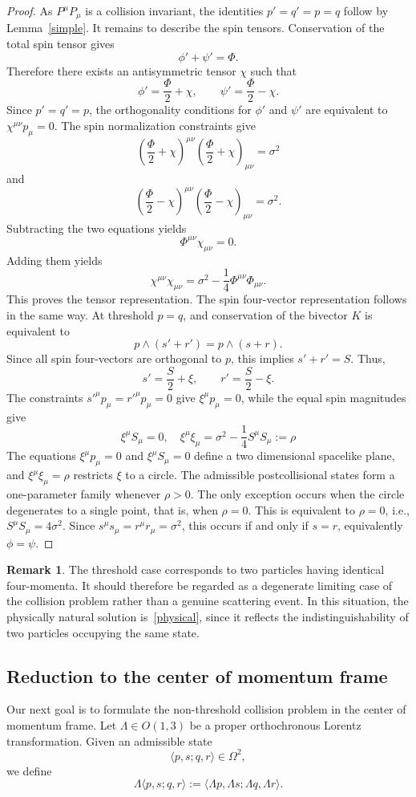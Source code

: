 \documentclass[12pt]{article}
\theoremstyle{plain}
\theoremstyle{definition}
\newtheorem{remark}[theorem]{Remark}
\begin{document}
\begin{proof}
As $P^\mu P_\mu$ is a collision invariant, the identities $p'=q'=p=q$ follow by Lemma~\ref{simple}. 
It remains to describe the spin tensors. Conservation of the total spin tensor gives
\[
\phi'+\psi'=\Phi.
\]
Therefore there exists an antisymmetric tensor $\chi$ such that
\[
\phi'=\frac{\Phi}{2}+\chi,
\qquad
\psi'=\frac{\Phi}{2}-\chi.
\]
Since $p'=q'=p$, the orthogonality conditions for $\phi'$ and $\psi'$ are equivalent to $\chi^{\mu\nu}p_\mu=0$. 
The spin normalization constraints give
\[
\left(\frac{\Phi}{2}+\chi\right)^{\mu\nu}
\left(\frac{\Phi}{2}+\chi\right)_{\mu\nu}
=
\sigma^2
\]
and
\[
\left(\frac{\Phi}{2}-\chi\right)^{\mu\nu}
\left(\frac{\Phi}{2}-\chi\right)_{\mu\nu}
=
\sigma^2.
\]
Subtracting the two equations yields
\[
\Phi^{\mu\nu}\chi_{\mu\nu}=0.
\]
Adding them yields
\[
\chi^{\mu\nu}\chi_{\mu\nu}
=
\sigma^2-\frac14\Phi^{\mu\nu}\Phi_{\mu\nu}.
\]
This proves the tensor representation.
The spin four-vector representation follows in the same way. At threshold $p=q$, and conservation of the bivector $K$ is equivalent to
\[
p\wedge(s'+r')=p\wedge(s+r).
\]
Since all spin four-vectors are orthogonal to $p$, this implies $s'+r'=S$.
Thus,
\[
s'=\frac{S}{2}+\xi,
\qquad
r'=\frac{S}{2}-\xi.
\]
The constraints $s'^\mu p_\mu=r'^\mu p_\mu=0$ give $\xi^\mu p_\mu=0$,
while the equal spin magnitudes give
\[
\xi^\mu S_\mu=0,\quad
\xi^\mu\xi_\mu
=
\sigma^2-\frac14 S^\mu S_\mu:=\rho
\]
The equations $\xi^\mu p_\mu=0$ and $\xi^\mu S_\mu=0$ define a two dimensional spacelike plane, and $\xi^\mu \xi_\mu=\rho$ restricts $\xi$ to a circle. The admissible postcollisional states form a one-parameter family whenever $\rho>0$. The only exception occurs when the circle degenerates to a single point, that is, when $\rho=0$. This is equivalent to $\rho=0$, i.e., $S^\mu S_\mu =4\sigma^2$. Since $s^\mu s_\mu=r^\mu r_\mu=\sigma^2$, this occurs if and only if $s=r$, equivalently $\phi=\psi$. 
\end{proof}
\begin{remark}
The threshold case corresponds to two particles having identical four-momenta. It should therefore be regarded as a degenerate limiting case of the collision problem rather than a genuine scattering event. In this situation, the physically natural solution is~\eqref{physical}, since it reflects the indistinguishability of two particles occupying the same state.
\end{remark}


\subsection{Reduction to the center of momentum frame}
Our next goal is to formulate the non-threshold collision problem in the center of momentum frame. 
Let $\Lambda\in O(1,3)$ be a proper orthochronous Lorentz transformation. Given an admissible state
\[
\langle p,s;q,r\rangle\in\Omega^2,
\]
we define
\[
\Lambda\langle p,s;q,r\rangle:=\langle\Lambda p,\Lambda s;\Lambda q,\Lambda r\rangle.
\]
\end{document}
